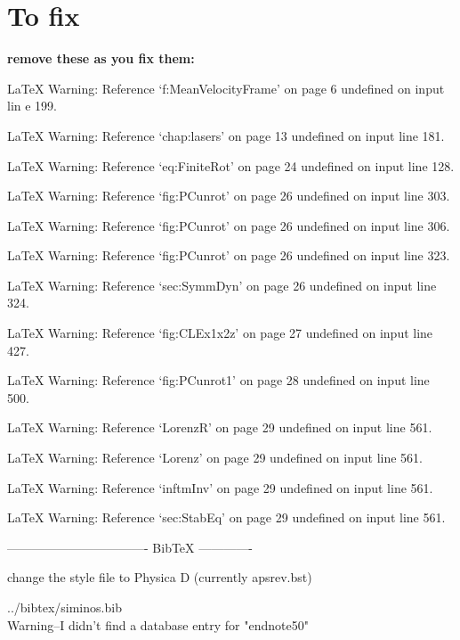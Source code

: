 
\section*{To fix}

{\bf remove these as you fix them:}





LaTeX Warning: Reference `f:MeanVelocityFrame' on page 6 undefined on input lin
e 199.


LaTeX Warning: Reference `chap:lasers' on page 13 undefined on input line 181.


LaTeX Warning: Reference `eq:FiniteRot' on page 24 undefined on input line 128.


LaTeX Warning: Reference `fig:PCunrot' on page 26 undefined on input line 303.


LaTeX Warning: Reference `fig:PCunrot' on page 26 undefined on input line 306.


LaTeX Warning: Reference `fig:PCunrot' on page 26 undefined on input line 323.


LaTeX Warning: Reference `sec:SymmDyn' on page 26 undefined on input line 324.


LaTeX Warning: Reference `fig:CLEx1x2z' on page 27 undefined on input line 427.


LaTeX Warning: Reference `fig:PCunrot1' on page 28 undefined on input line 500.


LaTeX Warning: Reference `LorenzR' on page 29 undefined on input line 561.


LaTeX Warning: Reference `Lorenz' on page 29 undefined on input line 561.


LaTeX Warning: Reference `inftmInv' on page 29 undefined on input line 561.


LaTeX Warning: Reference `sec:StabEq' on page 29 undefined on input line 561.

---------------------------------- BibTeX -------------


change the style file to Physica D (currently apsrev.bst)

../bibtex/siminos.bib
\\
Warning--I didn't find a database entry for "endnote50"

